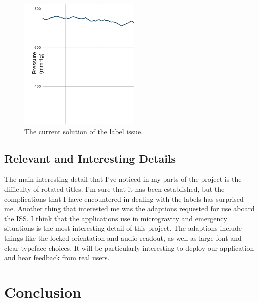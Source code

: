 \documentclass[onecolumn, draftclsnofoot,10pt, compsoc]{IEEEtran}
\begin{document}
\begin{figure}[H]
  \centering
  \includegraphics[width=.3\linewidth]{solution}
  \caption{The current solution of the label issue.}
  \label{fig:solution}
\end{figure}

\subsection{Relevant and Interesting Details}

The main interesting detail that I've noticed in my parts of the project is the difficulty of rotated titles.
I'm sure that it has been established, but the complications that I have encountered in dealing with the labels has surprised me.
Another thing that interested me was the adaptions requested for use aboard the ISS.
I think that the applications use in microgravity and emergency situations is the most interesting detail of this project.
The adaptions include things like the locked orientation and audio readout, as well as large font and clear typeface choices.
It will be particularly interesting to deploy our application and hear feedback from real users.

\section{Conclusion}
\end{document}
